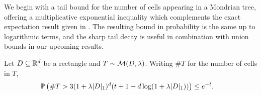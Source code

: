 We begin with a tail bound for the number of cells appearing
in a Mondrian tree, offering a multiplicative
exponential inequality which
complements the exact expectation result given in
\citet[Proposition~2]{mourtada2020minimax}.
The resulting bound in probability is the same up to
logarithmic terms, and the sharp tail decay is useful
in combination with union bounds in our upcoming results.

\begin{lemma}
  \label{lem:mondrian_app_cells_tail}

  Let $D \subseteq \R^d$ be a rectangle and
  $T \sim \cM(D, \lambda)$. Writing
  $\# T$ for the number of cells in $T$,
  \begin{align*}
    \P\left(
      \# T > 3 (1 + \lambda |D|_1)^d
      (t + 1 + d \log(1 + \lambda |D|_1))
    \right)
    &\leq
    e^{-t}.
  \end{align*}

\end{lemma}

